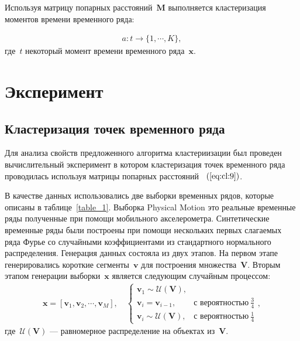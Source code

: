 \documentclass[12pt, twoside]{article}
\numberwithin{equation}{section}
\begin{document}
Используя матрицу попарных расстояний~$\textbf{M}$ выполняется кластеризация моментов времени временного ряда:

\begin{equation}
\label{eq:cl:10}
\begin{aligned}
a : t \to \{1,\cdots, K\}, 
\end{aligned}
\end{equation}
где~$t$ некоторый момент времени временного ряда~$\textbf{x}$.


\section{Эксперимент}
\subsection{Кластеризация точек временного ряда}
Для анализа свойств предложенного алгоритма кластериизации был проведен вычислительный эксперимент в котором кластеризация точек временного ряда проводилась используя матрицы попарных расстояний ~$(\ref{eq:cl:9})$.

В качестве данных использовались две выборки временных рядов, которые описаны в таблице~\ref{table_1}. Выборка Physical Motion это реальные временные ряды полученные при помощи мобильного акселерометра. Синтетические временные ряды были построены при помощи нескольких первых слагаемых ряда Фурье со случайными коэффициентами из стандартного нормального распределения. Генерация данных состояла из двух этапов. На первом этапе генерировались короткие сегменты~$\textbf{v}$ для построения множества~$\mathbf{V}$. Вторым этапом генерации выборки~$\textbf{x}$ является следующим случайным процессом:
\begin{equation}
\label{eq:exp:1}
\begin{aligned}
\textbf{x} = [\textbf{v}_{1}, \textbf{v}_{2}, \cdots, \textbf{v}_{M}], \quad \begin{cases}
    \textbf{v}_{1} \sim \mathcal{U}\left(\mathbf{V}\right),\\
    \textbf{v}_{i} = \textbf{v}_{i - 1}, & \text{с вероятностью}~\frac{3}{4}\\
    \textbf{v}_{i} \sim \mathcal{U}\left(\mathbf{V}\right), & \text{с вероятностью}~\frac{1}{4}
\end{cases},
\end{aligned}
\end{equation}
где~$\mathcal{U}\left(\mathbf{V}\right)$ --- равномерное распределение на объектах из~$\mathbf{V}$.
\end{document}
